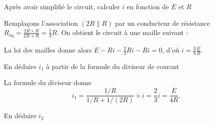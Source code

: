 \begin{enonce}
	Après avoir simplifié le circuit, calculer $i$ en fonction de $E$ et $R$
\end{enonce}


\begin{corrige}
	Remplaçons l'association $(2R\parallel R)$ par un conducteur de résistance $R_\text{eq}=\frac{2R\times R}{2R+R}=\frac23 R$. On obtient le circuit à une maille suivant :
	\begin{center}

	\end{center}
	La loi des mailles donne alors $E-Ri-\frac23 Ri-Ri=0$, d'où $i=\frac38 \frac{E}{R}$.
\end{corrige}


\begin{enonce}
	En déduire $i_1$ à partir de la formule du diviseur de courant
\end{enonce}


\begin{corrige}
	La formule du diviseur donne 
	\[
		i_1=\frac{1/R}{1/R+1/(2R)}\times i=\frac23 i= \frac{E}{4R}.
	\]
\end{corrige}


\begin{enonce}
	En déduire $i_2$
\end{enonce}


